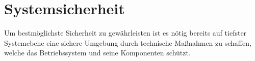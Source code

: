 \section{Systemsicherheit}\label{sec:systemsec}
	Um bestmöglichste Sicherheit zu gewährleisten ist es nötig bereits auf
	tiefster Systemebene eine sichere Umgebung durch technische Maßnahmen
	zu schaffen, welche das Betriebssystem und seine Komponenten schützt.
